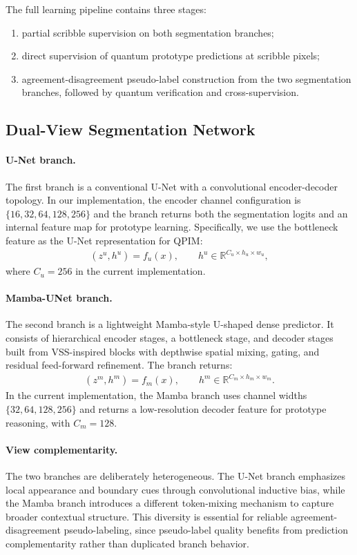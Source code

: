 The full learning pipeline contains three stages:
\begin{enumerate}
\item partial scribble supervision on both segmentation branches;
\item direct supervision of quantum prototype predictions at scribble pixels;
\item agreement-disagreement pseudo-label construction from the two segmentation branches, followed by quantum verification and cross-supervision.
\end{enumerate}

\subsection{Dual-View Segmentation Network}
\label{subsec:dual_view_network}
\paragraph{U-Net branch.}
The first branch is a conventional U-Net with a convolutional encoder-decoder topology. In our implementation, the encoder channel configuration is $\{16, 32, 64, 128, 256\}$ and the branch returns both the segmentation logits and an internal feature map for prototype learning. Specifically, we use the bottleneck feature as the U-Net representation for QPIM:
\begin{align}
    (z^u, h^u) = f_u(x), \qquad h^u \in \mathbb{R}^{C_u \times h_u \times w_u},
\end{align}
where $C_u = 256$ in the current implementation.

\paragraph{Mamba-UNet branch.}
The second branch is a lightweight Mamba-style U-shaped dense predictor. It consists of hierarchical encoder stages, a bottleneck stage, and decoder stages built from VSS-inspired blocks with depthwise spatial mixing, gating, and residual feed-forward refinement. The branch returns:
\begin{align}
    (z^m, h^m) = f_m(x), \qquad h^m \in \mathbb{R}^{C_m \times h_m \times w_m}.
\end{align}
In the current implementation, the Mamba branch uses channel widths $\{32, 64, 128, 256\}$ and returns a low-resolution decoder feature for prototype reasoning, with $C_m = 128$.

\paragraph{View complementarity.}
The two branches are deliberately heterogeneous. The U-Net branch emphasizes local appearance and boundary cues through convolutional inductive bias, while the Mamba branch introduces a different token-mixing mechanism to capture broader contextual structure. This diversity is essential for reliable agreement-disagreement pseudo-labeling, since pseudo-label quality benefits from prediction complementarity rather than duplicated branch behavior.

